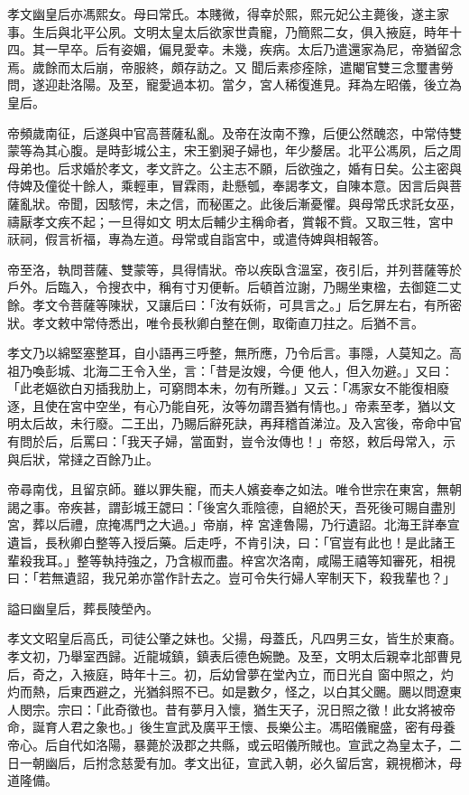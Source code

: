 \begin{pinyinscope}
 孝文幽皇后亦馮熙女。母曰常氏。本賤微，得幸於熙，熙元妃公主薨後，遂主家事。生后與北平公夙。文明太皇太后欲家世貴寵，乃簡熙二女，俱入掖庭，時年十四。其一早卒。后有姿媚，偏見愛幸。未幾，疾病。太后乃遣還家為尼，帝猶留念焉。歲餘而太后崩，帝服終，頗存訪之。又
 聞后素疹痊除，遣閹官雙三念璽書勞問，遂迎赴洛陽。及至，寵愛過本初。當夕，宮人稀復進見。拜為左昭儀，後立為皇后。



 帝頻歲南征，后遂與中官高菩薩私亂。及帝在汝南不豫，后便公然醜恣，中常侍雙蒙等為其心腹。是時彭城公主，宋王劉昶子婦也，年少嫠居。北平公馮夙，后之周母弟也。后求婚於孝文，孝文許之。公主志不願，后欲強之，婚有日矣。公主密與侍婢及僮從十餘人，乘輕車，冒霖雨，赴懸瓠，奉謁孝文，自陳本意。因言后與菩薩亂狀。帝聞，因駭愕，未之信，而秘匿之。此後后漸憂懼。與母常氏求託女巫，禱厭孝文疾不起；一旦得如文
 明太后輔少主稱命者，賞報不貲。又取三牲，宮中祆祠，假言祈福，專為左道。母常或自詣宮中，或遣侍婢與相報答。



 帝至洛，執問菩薩、雙蒙等，具得情狀。帝以疾臥含溫室，夜引后，并列菩薩等於戶外。后臨入，令搜衣中，稱有寸刃便斬。后頓首泣謝，乃賜坐東楹，去御筵二丈餘。孝文令菩薩等陳狀，又讓后曰：「汝有妖術，可具言之。」后乞屏左右，有所密狀。孝文敕中常侍悉出，唯令長秋卿白整在側，取衛直刀拄之。后猶不言。



 孝文乃以綿堅塞整耳，自小語再三呼整，無所應，乃令后言。事隱，人莫知之。高祖乃喚彭城、北海二王令入坐，言：「昔是汝嫂，今便
 他人，但入勿避。」又曰：「此老嫗欲白刃插我肋上，可窮問本未，勿有所難。」又云：「馮家女不能復相廢逐，且使在宮中空坐，有心乃能自死，汝等勿謂吾猶有情也。」帝素至孝，猶以文明太后故，未行廢。二王出，乃賜后辭死訣，再拜稽首涕泣。及入宮後，帝命中官有問於后，后罵曰：「我天子婦，當面對，豈令汝傳也！」帝怒，敕后母常入，示與后狀，常撻之百餘乃止。



 帝尋南伐，且留京師。雖以罪失寵，而夫人嬪妾奉之如法。唯令世宗在東宮，無朝謁之事。帝疾甚，謂彭城王勰曰：「後宮久乖陰德，自絕於天，吾死後可賜自盡別宮，葬以后禮，庶掩馮門之大過。」帝崩，梓
 宮達魯陽，乃行遺詔。北海王詳奉宣遺旨，長秋卿白整等入授后藥。后走呼，不肯引決，曰：「官豈有此也！是此諸王輩殺我耳。」整等執持強之，乃含椒而盡。梓宮次洛南，咸陽王禧等知審死，相視曰：「若無遺詔，我兄弟亦當作計去之。豈可令失行婦人宰制天下，殺我輩也？」



 謚曰幽皇后，葬長陵塋內。



 孝文文昭皇后高氏，司徒公肇之妹也。父揚，母蓋氏，凡四男三女，皆生於東裔。孝文初，乃舉室西歸。近龍城鎮，鎮表后德色婉艷。及至，文明太后親幸北部曹見后，奇之，入掖庭，時年十三。初，后幼曾夢在堂內立，而日光自
 窗中照之，灼灼而熱，后東西避之，光猶斜照不已。如是數夕，怪之，以白其父颺。颺以問遼東人閔宗。宗曰：「此奇徵也。昔有夢月入懷，猶生天子，況日照之徵！此女將被帝命，誕育人君之象也。」後生宣武及廣平王懷、長樂公主。馮昭儀寵盛，密有母養帝心。后自代如洛陽，暴薨於汲郡之共縣，或云昭儀所賊也。宣武之為皇太子，二日一朝幽后，后拊念慈愛有加。孝文出征，宣武入朝，必久留后宮，親視櫛沐，母道隆備。




\end{pinyinscope}
